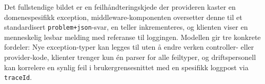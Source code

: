 Det fullstendige bildet er en feilhåndteringskjede der provideren kaster en domenespesifikk exception, middleware-komponenten oversetter denne til et standardisert \texttt{problem+json}-svar, en teller inkrementeres, og klienten viser en menneskelig lesbar melding med referanse til loggingen. Modellen gir tre konkrete fordeler: Nye exception-typer kan legges til uten å endre verken controller- eller provider-kode, klienter trenger kun én parser for alle feiltyper, og driftspersonell kan korrelere en synlig feil i brukergrensesnittet med en spesifikk loggpost via \texttt{traceId}.
